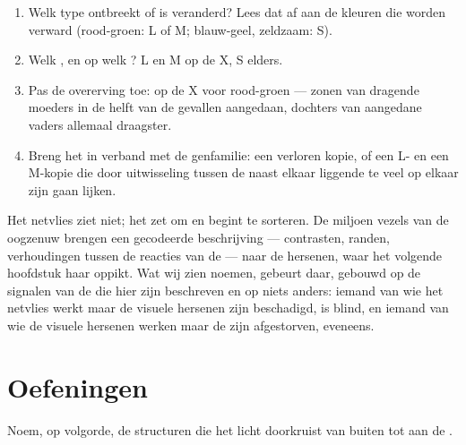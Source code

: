 \begin{method}\label{met:g11:the-eye:case}
\begin{enumerate}
  \item Welk type  ontbreekt of is veranderd? Lees dat af aan
        de kleuren die worden verward (rood-groen: L of M; blauw-geel,
        zeldzaam: S).
  \item Welk , en op welk ? L en M op de X, S elders.
  \item Pas de overerving toe:  op de X voor rood-groen ---
        zonen van dragende moeders in de helft van de gevallen aangedaan,
        dochters van aangedane vaders allemaal draagster.
  \item Breng het in verband met de genfamilie: een verloren kopie, of
        een L- en een M-kopie die door uitwisseling tussen de naast
        elkaar liggende  te veel op elkaar zijn gaan lijken.
\end{enumerate}
\end{method}

\begin{remark}\label{rem:g11:the-eye:tobrain}
Het netvlies ziet niet; het zet om en begint te sorteren. De miljoen
vezels van de oogzenuw brengen een gecodeerde beschrijving ---
contrasten, randen, verhoudingen tussen de reacties van de  ---
naar de hersenen, waar het volgende hoofdstuk haar oppikt. Wat wij zien
noemen, gebeurt daar, gebouwd op de signalen van de  die hier zijn
beschreven en op niets anders: iemand van wie het netvlies werkt maar de
visuele hersenen zijn beschadigd, is blind, en iemand van wie de visuele
hersenen werken maar de  zijn afgestorven, eveneens.
\end{remark}

\section{Oefeningen}

\begin{exercise}[$\star$]\label{exo:g11:the-eye:1}
Noem, op volgorde, de structuren die het licht doorkruist van buiten tot
aan de .
\end{exercise}

